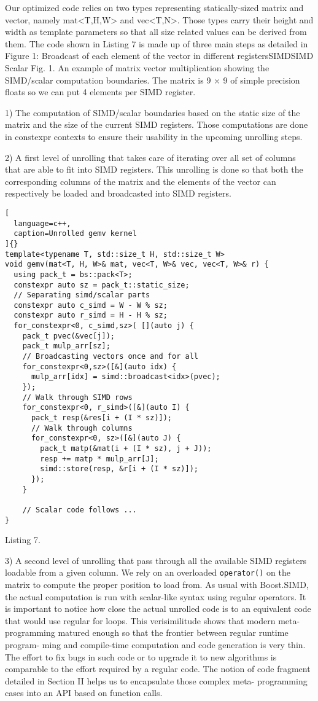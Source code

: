 \documentclass[../../main.tex]{subfiles}
\begin{document}
Our optimized code relies on two types representing
statically-sized matrix and vector, namely mat<T,H,W>
and vec<T,N>. Those types carry their height and width
as template parameters so that all size related values can be
derived from them. The code shown in Listing 7 is made up
of three main steps as detailed in Figure 1:
Broadcast of each element of
the vector in different registersSIMDSIMD Scalar
Fig. 1. An example of matrix vector multiplication showing the SIMD/scalar
computation boundaries. The matrix is 9 × 9 of simple precision floats so we
can put 4 elements per SIMD register.

1) The computation of SIMD/scalar boundaries based
on the static size of the matrix and the size of the
current SIMD registers. Those computations are done
in constexpr contexts to ensure their usability in the
upcoming unrolling steps.

2) A first level of unrolling that takes care of iterating
over all set of columns that are able to fit into SIMD
registers. This unrolling is done so that both the
corresponding columns of the matrix and the elements
of the vector can respectively be loaded and broadcasted
into SIMD registers.

\begin{lstlisting}[
  language=c++,
  caption=Unrolled gemv kernel
]{}
template<typename T, std::size_t H, std::size_t W>
void gemv(mat<T, H, W>& mat, vec<T, W>& vec, vec<T, W>& r) {
  using pack_t = bs::pack<T>;
  constexpr auto sz = pack_t::static_size;
  // Separating simd/scalar parts
  constexpr auto c_simd = W - W % sz;
  constexpr auto r_simd = H - H % sz;
  for_constexpr<0, c_simd,sz>( [](auto j) {
    pack_t pvec(&vec[j]);
    pack_t mulp_arr[sz];
    // Broadcasting vectors once and for all
    for_constexpr<0,sz>([&](auto idx) {
      mulp_arr[idx] = simd::broadcast<idx>(pvec);
    });
    // Walk through SIMD rows
    for_constexpr<0, r_simd>([&](auto I) {
      pack_t resp(&res[i + (I * sz)]);
      // Walk through columns
      for_constexpr<0, sz>([&](auto J) {
        pack_t matp(&mat(i + (I * sz), j + J));
        resp += matp * mulp_arr[J];
        simd::store(resp, &r[i + (I * sz)]);
      });
    }

    // Scalar code follows ...
}
\end{lstlisting}
Listing 7.

3) A second level of unrolling that pass through all the
available SIMD registers loadable from a given column.
We rely on an overloaded \lstinline{operator()} on the matrix
to compute the proper position to load from. As usual
with Boost.SIMD, the actual computation is run with
scalar-like syntax using regular operators.
It is important to notice how close the actual unrolled code
is to an equivalent code that would use regular for loops. This
verisimilitude shows that modern meta-programming matured
enough so that the frontier between regular runtime program-
ming and compile-time computation and code generation is
very thin. The effort to fix bugs in such code or to upgrade
it to new algorithms is comparable to the effort required
by a regular code. The notion of code fragment detailed
in Section II helps us to encapsulate those complex meta-
programming cases into an API based on function calls.
\end{document}
